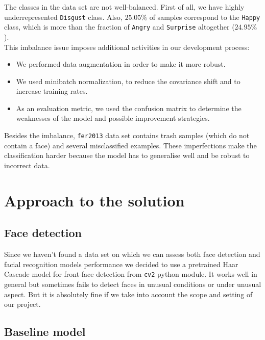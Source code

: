 The classes in the data set are not well-balanced. First of all, we have highly underrepresented \texttt{Disgust} class. Also, $25.05\%$ of samples correspond to the \texttt{Happy} class, which is more than the fraction of \texttt{Angry} and \texttt{Surprise} altogether ($24.95\%$).\\ 

This imbalance issue imposes additional activities in our development process:

\begin{itemize}
    \item 
    We performed data augmentation in order to make it more robust.
    \item
    We used minibatch normalization, to reduce the covariance shift and to increase training rates.
    \item
    As an evaluation metric, we used the confusion matrix to determine the weaknesses of the model and possible improvement strategies.
\end{itemize}

Besides the imbalance, \texttt{fer2013} data set contains trash samples (which do not contain a face) and several misclassified examples. These imperfections make the classification harder because the model has to generalise well and be robust to incorrect data. 





\section{Approach to the solution}
\subsection{Face detection}

 Since we haven't found a data set on which we can assess both face detection and facial recognition models performance we decided to use a pretrained Haar Cascade model for front-face detection from \texttt{cv2} python module. It works well in general but sometimes fails to detect faces in unusual conditions or under unusual aspect. But it is absolutely fine if we take into account the scope and setting of our project.\\

\subsection{Baseline model}


